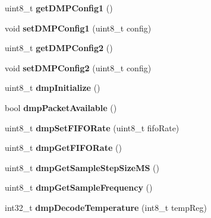 \begin{DoxyCompactItemize}
\item 
\mbox{\label{class_m_p_u6050_a421cdf4cea9fea87decbd69084ba4956}} 
uint8\+\_\+t {\bfseries get\+D\+M\+P\+Config1} ()
\item 
\mbox{\label{class_m_p_u6050_a0126b95e4074de16bb61d9c4e4cf837f}} 
void {\bfseries set\+D\+M\+P\+Config1} (uint8\+\_\+t config)
\item 
\mbox{\label{class_m_p_u6050_a29594027f88c291708a38fba67c4ecd5}} 
uint8\+\_\+t {\bfseries get\+D\+M\+P\+Config2} ()
\item 
\mbox{\label{class_m_p_u6050_aea90c3e6a6666f070f7833a913cfa821}} 
void {\bfseries set\+D\+M\+P\+Config2} (uint8\+\_\+t config)
\item 
\mbox{\label{class_m_p_u6050_a8b97688e8dd18be09865c2a31c4f3fe9}} 
uint8\+\_\+t {\bfseries dmp\+Initialize} ()
\item 
\mbox{\label{class_m_p_u6050_acac466f057c9ac7797a46c00cad66387}} 
bool {\bfseries dmp\+Packet\+Available} ()
\item 
\mbox{\label{class_m_p_u6050_a38853416eedf4074d15bc0ea4da47bd9}} 
uint8\+\_\+t {\bfseries dmp\+Set\+F\+I\+F\+O\+Rate} (uint8\+\_\+t fifo\+Rate)
\item 
\mbox{\label{class_m_p_u6050_abe2e585ddbb8ed4dd06287b97e399725}} 
uint8\+\_\+t {\bfseries dmp\+Get\+F\+I\+F\+O\+Rate} ()
\item 
\mbox{\label{class_m_p_u6050_a4f08483cb6b6f9917f602290fa4aee1b}} 
uint8\+\_\+t {\bfseries dmp\+Get\+Sample\+Step\+Size\+MS} ()
\item 
\mbox{\label{class_m_p_u6050_a88b471672ecfe54e46868ab985d8d82b}} 
uint8\+\_\+t {\bfseries dmp\+Get\+Sample\+Frequency} ()
\item 
\mbox{\label{class_m_p_u6050_ae15d6ac608ea2f4758aecd3a884e6014}} 
int32\+\_\+t {\bfseries dmp\+Decode\+Temperature} (int8\+\_\+t temp\+Reg)
\item 

\end{DoxyCompactItemize}
